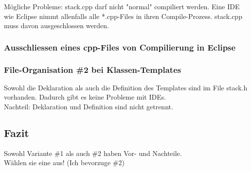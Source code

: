 
\begin{achtung}
	Mögliche Probleme: stack.cpp darf nicht "normal" compiliert werden. Eine IDE wie Eclipse nimmt allenfalls alle *.cpp-Files in ihren Compile-Prozess. stack.cpp muss davon ausgeschlossen werden.
\end{achtung}

\subsubsection{Ausschliessen eines cpp-Files von Compilierung in Eclipse}
\label{sec:Ausschliessen eines cpp-Files von Compilierung in Eclipse}


\subsubsection{File-Organisation \#2 bei Klassen-Templates}
%
%


\begin{hinweis}
Sowohl die Deklaration als auch die Definition des Templates sind im File stack.h vorhanden. Dadurch gibt es keine Probleme mit IDEs.\\
Nachteil: Deklaration und Definition sind nicht getrennt.
\end{hinweis}

\subsection{Fazit}
\label{sec:Fazit}
Sowohl Variante \#1 als auch \#2 haben Vor- und Nachteile.\\
Wählen sie eine aus! (Ich bevorzuge \#2)